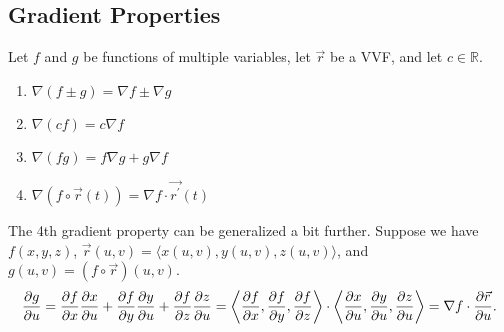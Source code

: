 \subsection{Gradient Properties}
\noindent
Let $f$ and $g$ be functions of multiple variables, let $\vec{r}$ be a VVF, and let $c \in \mathbb{R}$.
\begin{enumerate}
	\item $\nabla(f \pm g) = \nabla f \pm \nabla g$
	\item $\nabla(cf) = c\nabla f$
	\item $\nabla(fg) = f\nabla g + g\nabla f$
	\item $\nabla(f\circ\vec{r}(t)) = \nabla f \cdot \vec{r^\prime}(t)$
\end{enumerate}

\noindent
The 4th gradient property can be generalized a bit further.
Suppose we have $f(x,y,z)$, $\vec{r}(u,v) = \langle x(u,v), y(u,v), z(u,v) \rangle$, and $g(u,v) = (f\circ\vec{r})(u,v)$.
\begin{equation*}
	\frac{\partial g}{\partial u} = \frac{\partial f}{\partial x}\frac{\partial x}{\partial u} + \frac{\partial f}{\partial y}\frac{\partial y}{\partial u} + \frac{\partial f}{\partial z}\frac{\partial z}{\partial u} = \bigg\langle \frac{\partial f}{\partial x}, \frac{\partial f}{\partial y}, \frac{\partial f}{\partial z} \bigg\rangle \cdot \bigg\langle \frac{\partial x}{\partial u}, \frac{\partial y}{\partial u}, \frac{\partial z}{\partial u} \bigg\rangle = \nabla f \cdot \frac{\partial \vec{r}}{\partial u}.
\end{equation*}